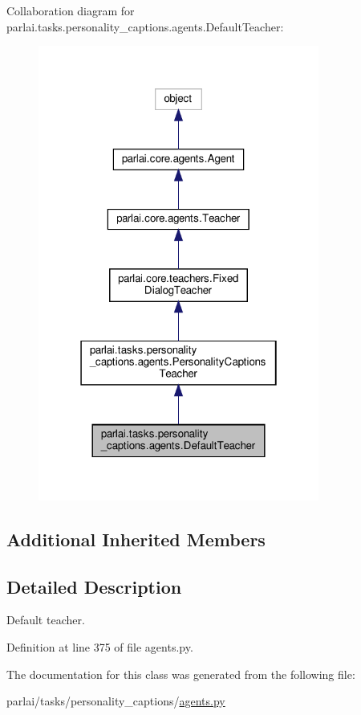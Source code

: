 Collaboration diagram for parlai.\+tasks.\+personality\+\_\+captions.\+agents.\+Default\+Teacher\+:
\nopagebreak
\begin{figure}[H]
\begin{center}
\leavevmode
\includegraphics[width=262pt]{d3/d59/classparlai_1_1tasks_1_1personality__captions_1_1agents_1_1DefaultTeacher__coll__graph}
\end{center}
\end{figure}
\subsection*{Additional Inherited Members}


\subsection{Detailed Description}
\begin{DoxyVerb}Default teacher.
\end{DoxyVerb}
 

Definition at line 375 of file agents.\+py.



The documentation for this class was generated from the following file\+:\begin{DoxyCompactItemize}
\item 
parlai/tasks/personality\+\_\+captions/\hyperlink{parlai_2tasks_2personality__captions_2agents_8py}{agents.\+py}\end{DoxyCompactItemize}
